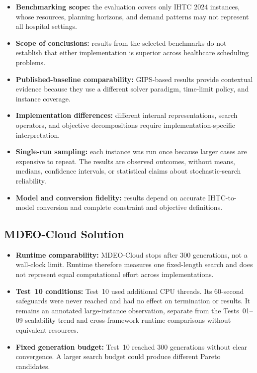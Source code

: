 \documentclass[11pt,a4paper]{article}
\begin{document}
\begin{itemize}
    \item \textbf{Benchmarking scope:} the evaluation covers only IHTC 2024 instances, whose resources, planning horizons, and demand patterns may not represent all hospital settings.
    \item \textbf{Scope of conclusions:} results from the selected benchmarks do not establish that either implementation is superior across healthcare scheduling problems.
    \item \textbf{Published-baseline comparability:} GIPS-based results provide contextual evidence because they use a different solver paradigm, time-limit policy, and instance coverage.
    \item \textbf{Implementation differences:} different internal representations, search operators, and objective decompositions require implementation-specific interpretation.
    \item \textbf{Single-run sampling:} each instance was run once because larger cases are expensive to repeat. The results are observed outcomes, without means, medians, confidence intervals, or statistical claims about stochastic-search reliability.
    \item \textbf{Model and conversion fidelity:} results depend on accurate IHTC-to-model conversion and complete constraint and objective definitions.
\end{itemize}

\subsection{MDEO-Cloud Solution}

\begin{itemize}
    \item \textbf{Runtime comparability:} MDEO-Cloud stops after 300 generations, not a wall-clock limit. Runtime therefore measures one fixed-length search and does not represent equal computational effort across implementations.
    \item \textbf{Test~10 conditions:} Test~10 used additional CPU threads. Its 60-second safeguards were never reached and had no effect on termination or results. It remains an annotated large-instance observation, separate from the Tests~01--09 scalability trend and cross-framework runtime comparisons without equivalent resources.
    \item \textbf{Fixed generation budget:} Test~10 reached 300 generations without clear convergence. A larger search budget could produce different Pareto candidates.
\end{itemize}
\end{document}
